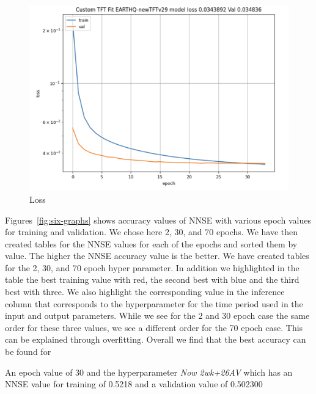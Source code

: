 \documentclass[utf8]{FrontiersinVancouver} %
\newcommand{\TODO}[1]{\todo[inline]{#1}}
\begin{document}
\begin{figure}[htb]
    \centering
    \includegraphics[width=0.70\columnwidth]{images/loss.png}
    \caption{Loss}
    \label{fig:loss}
\end{figure}

Figures~\ref{fig:six-graphs} shows accuracy values of NNSE with
various epoch values for training and validation. We chose here 2, 30,
and 70 epochs.  We have then created tables for the NNSE values for
each of the epochs and sorted them by value. The higher the NNSE
accuracy value is the better. We have created tables for the 2, 30,
and 70 epoch hyper parameter. In addition we highlighted in the table
the best training value with red, the second best with blue and the
third best with three. We also highlight the corresponding value in
the inference column that corresponds to the hyperparameter for the
time period used in the input and output parameters. While we see for
the 2 and 30 epoch case the same order for these three values, we see
a different order for the 70 epoch case. This can be explained through
overfitting. Overall we find that the best accuracy can be found for

An epoch value of 30  and the hyperparameter {\em Now 2wk+26AV} which has an NNSE value for training of 
0.5218 and a validation value of 0.502300 

\TODO{what is Now 2wk+26AV}
\end{document}
